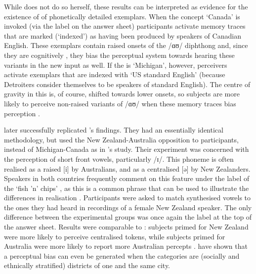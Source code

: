 While \citeauthor{niedzielski1999} does not do so herself, these results can be interpreted as evidence for the existence of  of phonetically detailed exemplars.
When the concept `Canada' is invoked (via the label on the answer sheet) participants activate memory traces that are marked (`indexed') as having been produced by speakers of Canadian English.
These exemplars contain raised onsets of the /ɑʊ/ diphthong and, since they are cognitively , they bias the perceptual system towards hearing these variants in the new input as well.
If the  is `Michigan', however, perceivers activate exemplars that are indexed with `US standard English' (because Detroiters consider themselves to be speakers of standard English).
The centre of gravity in this  is, of course, shifted towards lower onsets, so subjects are more likely to perceive non-raised variants of /ɑʊ/ when these memory traces bias perception \parencite[cf.][372]{hayetal2006a}.

\textcite{hayetal2006a} later successfully replicated \citeauthor{niedzielski1999}'s findings.
They had an essentially identical methodology, but used the New Zealand-Australia opposition to  participants, instead of Michigan-Canada as in \citeauthor{niedzielski1999}'s study.
Their experiment was concerned with the perception of short front vowels, particularly /ɪ/.
This phoneme is often realised as a raised [i] by Australians, and as a centralised [ə] by New Zealanders.
Speakers in both countries frequently comment on this feature under the label of the `fish 'n' chips' , as this is a common phrase that can be used to illustrate the differences in realisation \parencite[cf.][354]{hayetal2006a}.
Participants were asked to match synthesised vowels to the ones they had heard in recordings of a female New Zealand speaker.
The only difference between the experimental groups was once again the label at the top of the answer sheet.
Results were comparable to \citealt{niedzielski1999}: subjects primed for New Zealand were more likely to perceive centralised tokens, while subjects primed for Australia were more likely to report more Australian percepts \parencite[cf.][359--363]{hayetal2006a}.
\textcite{jannedyetal2011} have shown that a perceptual bias can even be generated when the  categories are (socially and ethnically stratified) districts of one and the same city.

